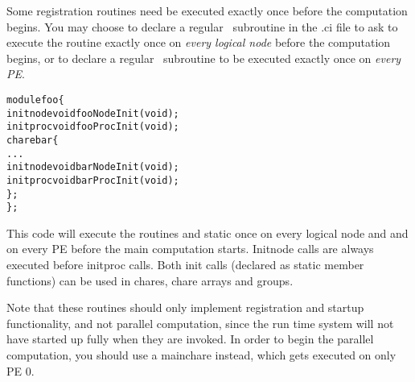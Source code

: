 
\label{initnode}
\label{initproc}
Some registration routines need be executed exactly once
before the computation begins. You may choose to 
declare a regular  \CC\ subroutine  in the .ci file
to ask \charmpp{} to execute the routine exactly once on {\em every logical node} 
before the computation begins, or to declare a regular  \CC\ subroutine 
 to be executed exactly once on {\em every PE}.

\begin{alltt}
module foo \{
    initnode void fooNodeInit(void);
    initproc void fooProcInit(void);
    chare bar \{
        ...
        initnode void barNodeInit(void);
        initproc void barProcInit(void);
    \};
\};
\end{alltt}

This code will execute the routines  and static 
 once on every logical node and 
and  on every PE before the main computation
starts.
Initnode calls are always executed before initproc calls.
Both init calls (declared as static member functions) can be used in chares, 
chare arrays and groups.

Note that these routines should only implement registration and startup functionality, 
and not parallel computation, since
the \charmpp{} run time system will not have started up fully when they are invoked. 
In order to begin the parallel computation, you should 
use a mainchare instead, which gets executed on only PE 0.

